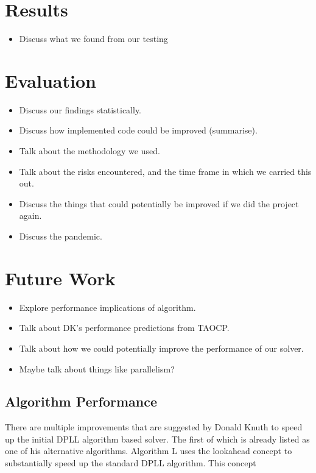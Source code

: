 \documentclass{article}
\begin{document}

\section{Results}
\begin{itemize}
    \item Discuss what we found from our testing
\end{itemize}

\section{Evaluation}
\begin{itemize}
    \item Discuss our findings statistically.
    \item Discuss how implemented code could be improved (summarise).
    \item Talk about the methodology we used.
    \item Talk about the risks encountered, and the time frame in which we carried this out.
    \item Discuss the things that could potentially be improved if we did the project again.
    \item Discuss the pandemic.
\end{itemize}

\section{Future Work}
\begin{itemize}
    \item Explore performance implications of algorithm.
    \item Talk about DK's performance predictions from TAOCP.
    \item Talk about how we could potentially improve the performance of our solver.
    \item Maybe talk about things like parallelism?
\end{itemize}

\subsection{Algorithm Performance}
There are multiple improvements that are suggested by Donald Knuth to speed up the initial DPLL algorithm based solver. The first of which is already listed as one of his alternative algorithms. Algorithm L uses the lookahead concept to substantially speed up the standard DPLL algorithm. This concept %
\end{document}
